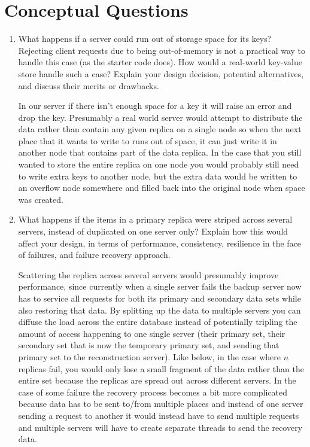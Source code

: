 \documentclass[11pt,twoside]{article}
\begin{document}
\section{Conceptual Questions}
\begin{enumerate}
    \item What happens if a server could run out of storage space for its keys? Rejecting client requests due to being out-of-memory is not a practical way to handle this case (as the starter code does). How would a real-world key-value store handle such a case? Explain your design decision, potential alternatives, and discuss their merits or drawbacks.
    
    In our server if there isn't enough space for a key it will raise an error and drop the key. Presumably a real world server would attempt to distribute the data rather than contain any given replica on a single node so when the next place that it wants to write to runs out of space, it can just write it in another node that contains part of the data replica. In the case that you still wanted to store the entire replica on one node you would probably still need to write extra keys to another node, but the extra data would be written to an overflow node somewhere and filled back into the original node when space was created.


    \item What happens if the items in a primary replica were striped across several servers, instead of duplicated on one server only? Explain how this would affect your design, in terms of performance, consistency, resilience in the face of failures, and failure recovery approach.
    
    Scattering the replica across several servers would presumably improve performance, since currently when a single server fails the backup server now has to service all requests for both its primary and secondary data sets while also restoring that data. By splitting up the data to multiple servers you can diffuse the load across the entire database instead of potentially tripling the amount of access happening to one single server (their primary set, their secondary set that is now the temporary primary set, and sending that primary set to the reconstruction server). Like below, in the case where $n$ replicas fail, you would only lose a small fragment of the data rather than the entire set because the replicas are spread out across different servers. In the case of some failure the recovery process becomes a bit more complicated because data has to be sent to/from multiple places and instead of one server sending a request to another it would instead have to send multiple requests and multiple servers will have to create separate threads to send the recovery data.
    

\end{enumerate}
\end{document}
